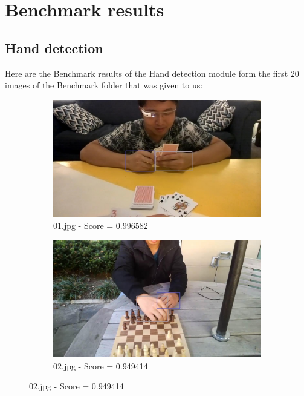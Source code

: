 \section{Benchmark results}

\subsection{Hand detection}
Here are the Benchmark results of the Hand detection module form the first 20 images of the Benchmark folder that was given to us:

\begin{figure}[!h]
    \centering
    \begin{subfigure}[b]{0.3 \textwidth}
        \centering
        \includegraphics[width=\textwidth]{images/handDetection/01.jpg}
        \caption{01.jpg - Score = 0.996582}
        
    \end{subfigure}
    \hfill
    \begin{subfigure}[b]{0.3\textwidth}
        \centering
        \includegraphics[width=\textwidth]{images/handDetection/02.jpg}
        \caption{02.jpg - Score = 0.949414}
       

\end{subfigure}
\end{figure}

